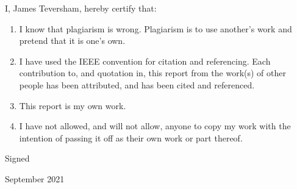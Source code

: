 \noindent
I, James Teversham, hereby certify that:
\vspace{0.5cm}
\begin{enumerate}
    \item  I know that plagiarism is wrong. Plagiarism is to use another’s work and pretend that it is one’s own. 
    \item I have used the IEEE convention for citation and referencing. Each contribution to, and quotation in, this report from the work(s) of other people has been attributed, and has been cited and referenced.
    \item This report is my own work.
    \item I have not allowed, and will not allow, anyone to copy my work with the intention of passing it off as their own work or part thereof.
\end{enumerate}
\vspace{1cm}

\noindent
Signed
\vspace{2cm}

 September 2021